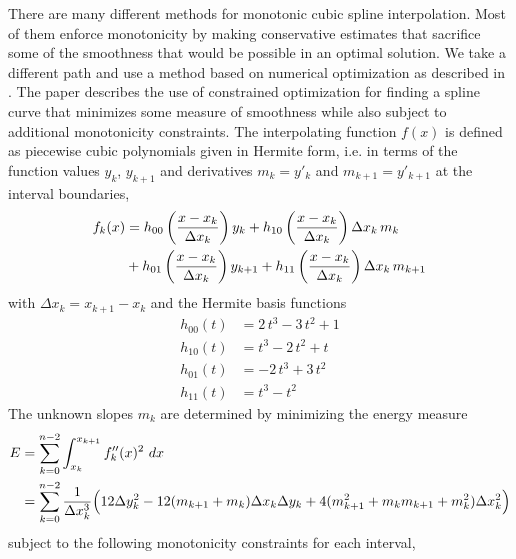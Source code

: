 There are many different methods for monotonic cubic spline interpolation.
Most of them enforce monotonicity by making conservative estimates that sacrifice some of the smoothness that would be possible in an optimal solution.
We take a different path and use a method based on numerical optimization as described in \cite{bib:woal02}.
The paper describes the use of constrained optimization for finding a spline curve that minimizes some measure of smoothness while also subject to additional monotonicity constraints. The interpolating function $f(x)$ is defined as piecewise cubic polynomials given in Hermite form, i.e. in terms of the function values $y_k$, $y_{k+1}$ and derivatives $m_{k} = y'_k$ and $m_{k+1} = y'_{k+1}$ at the interval boundaries,
%
\begin{align}
f_k(x) &= h_{00}\left(\frac{x - x_k}{\Delta x_k}\right)y_k + h_{10}\left(\frac{x - x_k}{\Delta x_k}\right)\Delta x_k\,m_k \notag \\
&+ h_{01}\left(\frac{x - x_k}{\Delta x_k}\right)y_{k+1} + h_{11}\left(\frac{x - x_k}{\Delta x_k}\right)\Delta x_k\,m_{k+1} 
\end{align}
%
with $\Delta x_k = x_{k+1} - x_{k}$ and the Hermite basis functions
%
\begin{align}
h_{00}(t) &= 2\,t^3 - 3\,t^2 + 1 \\
h_{10}(t) &= t^3 - 2\,t^2 + t \\
h_{01}(t) &= -2\,t^3 + 3\,t^2 \\
h_{11}(t) &= t^3 - t^2
\end{align}
%
The unknown slopes $m_k$ are determined by minimizing the energy measure
%
\begin{align}
E &= \sum_{k=0}^{n-2}\int_{x_k}^{x_{k+1}} f''_k(x)^2\ dx \notag \\
&= \sum_{k=0}^{n-2}\frac{1}{\Delta x_k^3}\Big( 12\Delta y_k^2 - 12(m_{k+1} + m_{k})\Delta x_k \Delta y_k + 4(m_{k+1}^2 + m_{k} m_{k+1} + m_{k}^2)\Delta x_k^2 \Big) \label{eq:spline-linearized-energy}
\end{align}
%
subject to the following monotonicity constraints for each interval,
%
